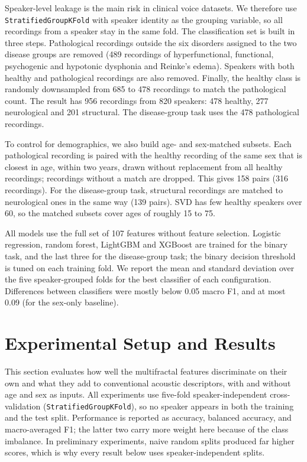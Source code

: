 \documentclass[runningheads]{llncs}
\begin{document}
  Speaker-level leakage is the main risk in clinical voice datasets. We therefore use \texttt{StratifiedGroupKFold} with speaker identity as the grouping variable, so all recordings from a speaker stay in the same fold. The classification set is built in three steps. Pathological recordings outside the six disorders assigned to the two disease groups are removed (489 recordings of hyperfunctional, functional, psychogenic and hypotonic dysphonia and Reinke's edema). Speakers with both healthy and pathological recordings are also removed. Finally, the healthy class is randomly downsampled from 685 to 478 recordings to match the pathological count. The result has 956 recordings from 820 speakers: 478 healthy, 277 neurological and 201 structural. The disease-group task uses the 478 pathological recordings.

  To control for demographics, we also build age- and sex-matched subsets. Each pathological recording is paired with the healthy recording of the same sex that is closest in age, within two years, drawn without replacement from all healthy recordings; recordings without a match are dropped. This gives 158 pairs (316 recordings). For the disease-group task, structural recordings are matched to neurological ones in the same way (139 pairs). SVD has few healthy speakers over 60, so the matched subsets cover ages of roughly 15 to 75.

  All models use the full set of 107 features without feature selection. Logistic regression, random forest, LightGBM and XGBoost are trained for the binary task, and the last three for the disease-group task; the binary decision threshold is tuned on each training fold. We report the mean and standard deviation over the five speaker-grouped folds for the best classifier of each configuration. Differences between classifiers were mostly below 0.05 macro F1, and at most 0.09 (for the sex-only baseline).
  \section{Experimental Setup and Results}
  \label{sec:experiments}

  This section evaluates how well the multifractal features discriminate on their own and what they add to conventional acoustic descriptors, with and without age and sex as inputs. All experiments use five-fold speaker-independent cross-validation (\texttt{StratifiedGroupKFold}), so no speaker appears in both the training and the test split. Performance is reported as accuracy, balanced accuracy, and macro-averaged F1; the latter two carry more weight here because of the class imbalance. In preliminary experiments, naive random splits produced far higher scores, which is why every result below uses speaker-independent splits.
\end{document}
